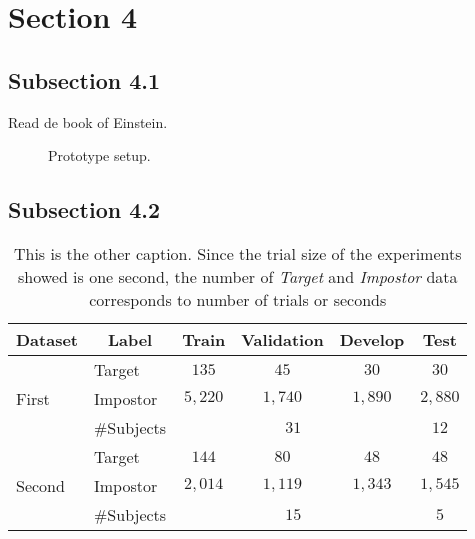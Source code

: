 \clearpage
\section{Section 4}
\label{sec:sect4}
\lipsum[8]
\subsection{Subsection 4.1}
\label{subsec:subsec4.1}
\lipsum[8]
Read de book \cite{einstein} of Einstein.

\begin{figure}[h]
\label{fig:prototype1}
\centering
\caption[Prototype setup]{\footnotesize{Prototype setup.}}
\end{figure}

\lipsum[14]

\subsection{Subsection 4.2}
\label{subsec:subsec4.2}

\begin{table}[H]
\centering
\caption[This is the caption]{ \footnotesize This is the other caption. Since the trial size of the experiments showed is one second, the number of \textit{Target} and \textit{Impostor} data corresponds to number of trials or seconds}
\label{tab:data_partition}
\footnotesize{
\begin{tabular}{@{}llcccc@{}}
\toprule
\textbf{Dataset}         & \multicolumn{1}{c}{\textbf{Label}} & \textbf{Train} & \textbf{Validation} & \textbf{Develop} & \textbf{Test} \\ \midrule
\midrule
\multirow{3}{*}{First} & Target   & $135$ & $45$  & $30$  & $30$  \\
                         & Impostor & $5,220$    & $1,740$ & $1,890$   & $2,880$    \\
\cmidrule(lr){3-5} \cmidrule(l){6-6}
                         & \#Subjects          & \multicolumn{3}{c}{$31$} & $12$ \\
\midrule
\multirow{3}{*}{Second}  & Target   & $144$ & $80$  & $48$  & $48$  \\
                         & Impostor & $2,014$    & $1,119$    & $1,343$    & $1,545$ \\
\cmidrule(lr){3-5} \cmidrule(l){6-6}
                         & \#Subjects   & \multicolumn{3}{c}{$15$} & $5$ \\ 
\bottomrule
\end{tabular}
}
\end{table}

